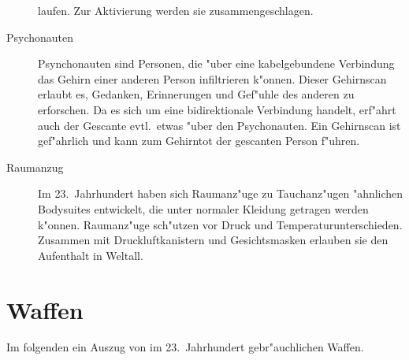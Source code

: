 \begin{description}
      laufen. Zur Aktivierung werden sie zusammengeschlagen.
\item [Psychonauten] Psynchonauten sind Personen, die "uber eine kabelgebundene Verbindung das Gehirn
      einer anderen Person infiltrieren k"onnen. Dieser Gehirnscan erlaubt es, Gedanken, Erinnerungen und Gef"uhle des anderen zu erforschen. Da es sich um eine bidirektionale Verbindung handelt, erf"ahrt auch der Gescante evtl.~etwas "uber den Psychonauten. Ein Gehirnscan ist gef"ahrlich und kann zum Gehirntot der gescanten Person f"uhren.
\item [Raumanzug] Im 23.~Jahrhundert haben sich Raumanz"uge zu Tauchanz"ugen "ahnlichen Bodysuites entwickelt, die unter
      normaler Kleidung getragen werden k"onnen. Raumanz"uge sch"utzen vor Druck und Temperaturunterschieden. Zusammen mit Druckluftkanistern und Gesichtsmasken erlauben sie den Aufenthalt in Weltall.
\end{description}

\section{Waffen}

Im folgenden ein Auszug von im 23.~Jahrhundert gebr"auchlichen Waffen.


